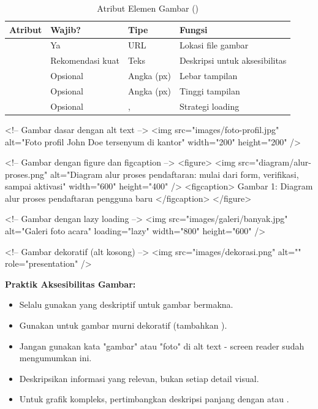 \begin{table}[H]
\centering
\begin{tabular}{|P{2.5cm}|P{2.5cm}|P{3cm}|P{4cm}|}
\hline
\textbf{Atribut} & \textbf{Wajib?} & \textbf{Tipe} & \textbf{Fungsi} \\
\hline
{} & Ya & URL & Lokasi file gambar \\
\hline
{} & Rekomendasi kuat & Teks & Deskripsi untuk aksesibilitas \\
\hline
{} & Opsional & Angka (px) & Lebar tampilan \\
\hline
{} & Opsional & Angka (px) & Tinggi tampilan \\
\hline
{} & Opsional & ,  & Strategi loading \\
\hline
\end{tabular}
\caption{Atribut Elemen Gambar ()}
\label{tab:img-attributes}
\end{table}

\begin{webcode}[language=HTML, caption={Contoh Penggunaan Gambar}]
<!-- Gambar dasar dengan alt text -->
<img src="images/foto-profil.jpg" 
     alt="Foto profil John Doe tersenyum di kantor" 
     width="200" height="200" />

<!-- Gambar dengan figure dan figcaption -->
<figure>
  <img src="diagram/alur-proses.png" 
       alt="Diagram alur proses pendaftaran: 
            mulai dari form, verifikasi, sampai aktivasi" 
       width="600" height="400" />
  <figcaption>
    Gambar 1: Diagram alur proses pendaftaran pengguna baru
  </figcaption>
</figure>

<!-- Gambar dengan lazy loading -->
<img src="images/galeri/banyak.jpg" 
     alt="Galeri foto acara" 
     loading="lazy" 
     width="800" height="600" />

<!-- Gambar dekoratif (alt kosong) -->
<img src="images/dekorasi.png" 
     alt="" 
     role="presentation" />
\end{webcode}

\begin{catatan}
\textbf{Praktik Aksesibilitas Gambar:}
\begin{itemize}[leftmargin=*]
  \item Selalu gunakan  yang deskriptif untuk gambar bermakna.
  \item Gunakan  untuk gambar murni dekoratif (tambahkan ).
  \item Jangan gunakan kata "gambar" atau "foto" di alt text - screen reader sudah mengumumkan ini.
  \item Deskripsikan informasi yang relevan, bukan setiap detail visual.
  \item Untuk grafik kompleks, pertimbangkan deskripsi panjang dengan  atau .
\end{itemize}
\end{catatan}

